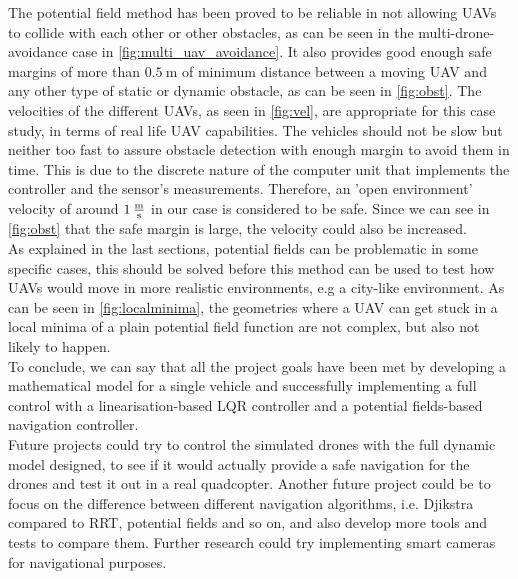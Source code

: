 \documentclass[journal]{IEEEtran}
\begin{document}
	The potential field method has been proved to be reliable in not allowing UAVs to collide with each other or other obstacles, as can be seen in the multi-drone-avoidance case in \figurename{ \ref{fig:multi_uav_avoidance}}. It also provides good enough safe margins of more than $\SI{0.5}{\meter}$ of minimum distance between a moving UAV and any other type of static or dynamic obstacle, as can be seen in \figurename{ \ref{fig:obst}}. The velocities of the different UAVs, as seen in \figurename{ \ref{fig:vel}}, are appropriate for this case study, in terms of real life UAV capabilities. The vehicles should not be slow but neither too fast to assure obstacle detection with enough margin to avoid them in time. This is due to the discrete nature of the computer unit that implements the controller and the sensor's measurements. Therefore, an 'open environment' velocity of around $\SI{1}{\frac{\meter}{\second}}$ in our case is considered to be safe. Since we can see in \figurename{ \ref{fig:obst}} that the safe margin is large, the velocity could also be increased. \\
	
	As explained in the last sections, potential fields can be problematic in some specific cases, this should be solved before this method can be used to test how UAVs would move in more realistic environments, e.g a city-like environment. As can be seen in \figurename{ \ref{fig:localminima}}, the geometries where a UAV can get stuck in a local minima of a plain potential field function are not complex, but also not likely to happen.\\
	
	To conclude, we can say that all the project goals have been met by developing a mathematical model for a single vehicle and successfully implementing a full control with a linearisation-based LQR controller and a potential fields-based navigation controller.\\

	Future projects could try to control the simulated drones with the full dynamic model designed, to see if it would actually provide a safe navigation for the drones and test it out in a real quadcopter. Another future project could be to focus on the difference between different navigation algorithms, i.e. Djikstra compared to RRT, potential fields and so on, and also develop more tools and tests to compare them. Further research could try implementing smart cameras for navigational purposes.
	
	
\end{document}
